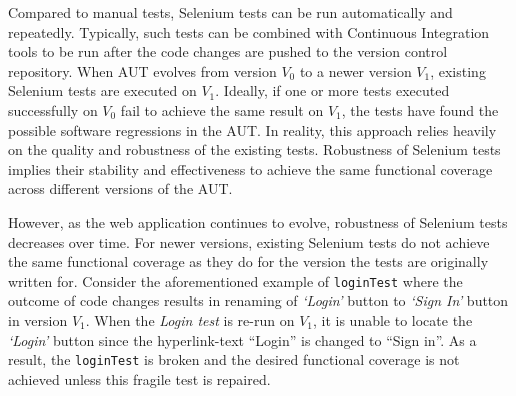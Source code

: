 
  

Compared to manual tests, Selenium tests can be run automatically and repeatedly. Typically, such tests can be combined with Continuous Integration tools to be run after the code changes are pushed to the version control repository. When AUT evolves from version $V_{0}$ to a newer version $V_{1}$, existing Selenium tests are executed on $V_{1}$. Ideally, if one or more tests executed successfully on $V_{0}$ fail to achieve the same result on $V_{1}$, the tests have found the possible software regressions in the AUT. In reality, this approach relies heavily on the quality and robustness of the existing tests. Robustness of Selenium tests implies their stability and effectiveness to achieve the same functional coverage across different versions of the AUT. 

However, as the web application continues to evolve, robustness of Selenium tests decreases over time. For newer versions, existing Selenium tests do not achieve the same functional coverage as they do for the version the tests are originally written for. Consider the aforementioned example of \texttt{loginTest} where the outcome of code changes results in renaming of \textit{`Login'} button to \textit{`Sign In'} button in version $V_{1}$. When the \textit{Login test} is re-run on $V_{1}$, it is unable to locate the \textit{`Login'} button since the hyperlink-text ``Login'' is changed to ``Sign in''. As a result, the \texttt{loginTest} is broken and the desired functional coverage is not achieved unless this fragile test is repaired. 

